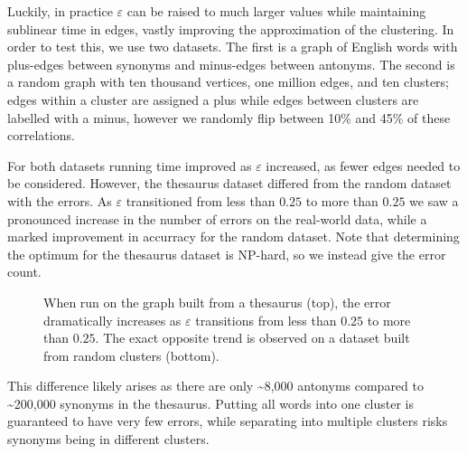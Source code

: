 \documentclass[
]{article}
\begin{document}
Luckily, in practice {\(\varepsilon\)} can be raised to much larger
values while maintaining sublinear time in edges, vastly improving the
approximation of the clustering. In order to test this, we use two
datasets. The first is a graph of English words with plus-edges between
synonyms and minus-edges between antonyms. The second is a random graph
with ten thousand vertices, one million edges, and ten clusters; edges
within a cluster are assigned a plus while edges between clusters are
labelled with a minus, however we randomly flip between 10\% and 45\% of
these correlations.

For both datasets running time improved as {\(\varepsilon\)} increased,
as fewer edges needed to be considered. However, the thesaurus dataset
differed from the random dataset with the errors. As {\(\varepsilon\)}
transitioned from less than {\(0.25\)} to more than {\(0.25\)} we saw a
pronounced increase in the number of errors on the real-world data,
while a marked improvement in accurracy for the random dataset. Note
that determining the optimum for the thesaurus dataset is NP-hard, so we
instead give the error count.

\begin{figure}[!htb]
  \caption{\label{fig:opposite-trends}
    When run on the graph built from a thesaurus (top), the error dramatically increases
    as $\varepsilon$ transitions from less than $0.25$ to more than $0.25$. The exact
    opposite trend is observed on a dataset built from random clusters (bottom).}
\end{figure}
This difference likely arises as there are only \textasciitilde8,000
antonyms compared to \textasciitilde200,000 synonyms in the thesaurus.
Putting all words into one cluster is guaranteed to have very few
errors, while separating into multiple clusters risks synonyms being in
different clusters.
\end{document}
